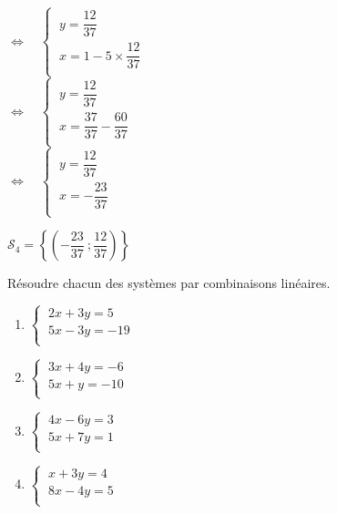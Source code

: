 \documentclass[a4paper,11pt,exos]{nsi} %
\begin{document}
\begin{enumerate}
\begin{tabbing}
                \>  $\iff\quad \left\{
                    \begin{array}{l}
                    \ y=\dfrac{12}{37} \\
                    \ x=1-5\times \dfrac{12}{37}\\
                \end{array} \right.$\\[.5em]

                \>  $\iff\quad \left\{
                    \begin{array}{l}
                    \ y=\dfrac{12}{37} \\[.5em]
                    \ x=\dfrac{37}{37}-\dfrac{60}{37}\\
                \end{array} \right.$\\[.5em]

                \>  $\iff\quad \left\{
                    \begin{array}{l}
                    \ y=\dfrac{12}{37} \\[.5em]
                    \ x=-\dfrac{23}{37}\\
                \end{array} \right.$
        \end{tabbing}
        $\mathcal{S}_4=\left\{\left(-\dfrac{23}{37}\ ;\dfrac{12}{37}\right)\right\}$
\end{enumerate}


\newpage


\begin{exercice}[ ]
	Résoudre chacun des systèmes par combinaisons linéaires.
	\begin{multicols}{2}
		\begin{enumerate}
			\item 		$\left\{
			\begin{array}{l}
				\ 2x+3y=5 \\
				\ 5x-3y=-19\\
			\end{array} \right.$
			\item 		$\left\{
			\begin{array}{l}
				\ 3x+4y=-6 \\
				\ 5x+y=-10 \\
			\end{array} \right.$	
			\item 		$\left\{
			\begin{array}{l}
				\ 4x-6y=3 \\
				\ 5x+7y=1 \\
			\end{array} \right.$
			\item 		$\left\{
			\begin{array}{l}
				\ x+3y=4 \\
				\ 8x-4y=5 \\
			\end{array} \right.$
		\end{enumerate}
	\end{multicols}
\end{exercice}
\end{document}
